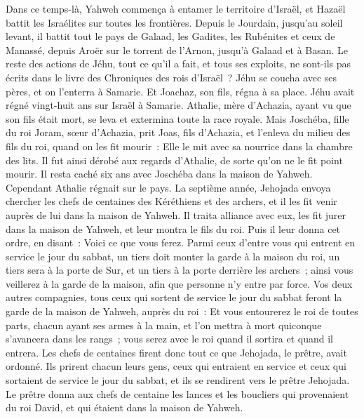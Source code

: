 \begin{multicols}{2}
Dans ce temps-là, Yahweh commença à entamer le territoire d'Israël, et Hazaël battit les Israélites sur toutes les frontières.
Depuis le Jourdain, jusqu'au soleil levant, il battit tout le pays de Galaad, les Gadites, les Rubénites et ceux de Manassé, depuis Aroër sur le torrent de l'Arnon, jusqu'à Galaad et à Basan.
Le reste des actions de Jéhu, tout ce qu'il a fait, et tous ses exploits, ne sont-ils pas écrits dans le livre des Chroniques des rois d'Israël~?
Jéhu se coucha avec ses pères, et on l'enterra à Samarie. Et Joachaz, son fils, régna à sa place.
Jéhu avait régné vingt-huit ans sur Israël à Samarie.
\VerseOne{}Athalie, mère d'Achazia, ayant vu que son fils était mort, se leva et extermina toute la race royale.
Mais Joschéba, fille du roi Joram, sœur d'Achazia, prit Joas, fils d'Achazia, et l'enleva du milieu des fils du roi, quand on les fit mourir~: Elle le mit avec sa nourrice dans la chambre des lits. Il fut ainsi dérobé aux regards d'Athalie, de sorte qu'on ne le fit point mourir.
Il resta caché six ans avec Joschéba dans la maison de Yahweh. Cependant Athalie régnait sur le pays.
La septième année, Jehojada envoya chercher les chefs de centaines des Kéréthiens et des archers, et il les fit venir auprès de lui dans la maison de Yahweh. Il traita alliance avec eux, les fit jurer dans la maison de Yahweh, et leur montra le fils du roi.
Puis il leur donna cet ordre, en disant~: Voici ce que vous ferez. Parmi ceux d'entre vous qui entrent en service le jour du sabbat, un tiers doit monter la garde à la maison du roi,
un tiers sera à la porte de Sur, et un tiers à la porte derrière les archers~; ainsi vous veillerez à la garde de la maison, afin que personne n'y entre par force.
Vos deux autres compagnies, tous ceux qui sortent de service le jour du sabbat feront la garde de la maison de Yahweh, auprès du roi~:
Et vous entourerez le roi de toutes parts, chacun ayant ses armes à la main, et l'on mettra à mort quiconque s'avancera dans les rangs~; vous serez avec le roi quand il sortira et quand il entrera.
Les chefs de centaines firent donc tout ce que Jehojada, le prêtre, avait ordonné. Ils prirent chacun leurs gens, ceux qui entraient en service et ceux qui sortaient de service le jour du sabbat, et ils se rendirent vers le prêtre Jehojada.
Le prêtre donna aux chefs de centaine les lances et les boucliers qui provenaient du roi David, et qui étaient dans la maison de Yahweh.

\end{multicols}
